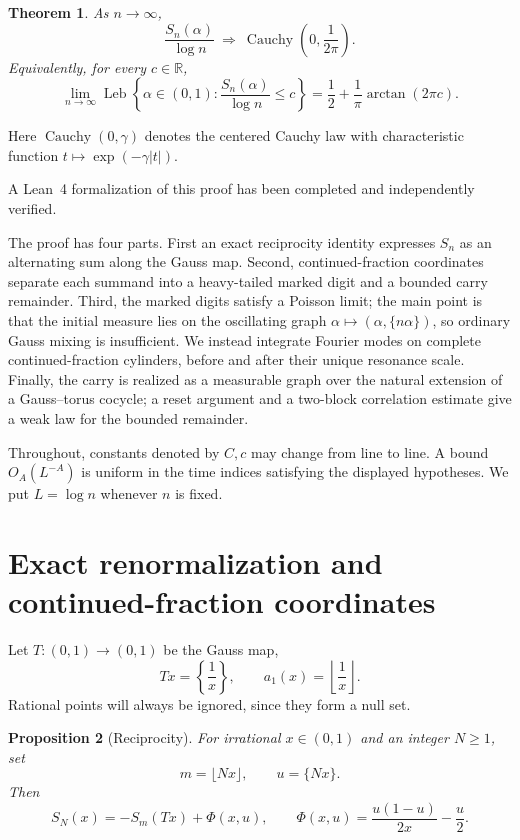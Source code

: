 \documentclass[11pt,a4paper]{amsart}
\newtheorem{theorem}{Theorem}[section]
\newtheorem{proposition}[theorem]{Proposition}
\theoremstyle{definition}
\theoremstyle{remark}
\newcommand{\R}{\mathbb R}
\newcommand{\Leb}{\operatorname{Leb}}
\begin{document}
\begin{theorem}\label{thm:main}
As $n\to\infty$,
\[
 \frac{S_n(\alpha)}{\log n}
 \ \Longrightarrow\
 \operatorname{Cauchy}\!\left(0,\frac1{2\pi}\right).
\]
Equivalently, for every $c\in\R$,
\[
 \lim_{n\to\infty}\Leb\left\{\alpha\in(0,1):
 \frac{S_n(\alpha)}{\log n}\le c\right\}
 =\frac12+\frac1\pi\arctan(2\pi c).
\]
\end{theorem}

Here $\operatorname{Cauchy}(0,\gamma)$ denotes the centered Cauchy law with
characteristic function $t\mapsto\exp(-\gamma|t|)$.

A Lean~4 formalization of this proof has been completed and independently
verified.

The proof has four parts.  First an exact reciprocity identity expresses
$S_n$ as an alternating sum along the Gauss map.  Second, continued-fraction
coordinates separate each summand into a heavy-tailed marked digit and a
bounded carry remainder.  Third, the marked digits satisfy a Poisson limit;
the main point is that the initial measure lies on the oscillating graph
$\alpha\mapsto(\alpha,\{n\alpha\})$, so ordinary Gauss mixing is insufficient.
We instead integrate Fourier modes on complete continued-fraction cylinders,
before and after their unique resonance scale.  Finally, the carry is realized
as a measurable graph over the natural extension of a Gauss--torus cocycle;
a reset argument and a two-block correlation estimate give a weak law for the
bounded remainder.

Throughout, constants denoted by $C,c$ may change from line to line.  A bound
$O_A(L^{-A})$ is uniform in the time indices satisfying the displayed
hypotheses.  We put $L=\log n$ whenever $n$ is fixed.

\section{Exact renormalization and continued-fraction coordinates}

Let $T:(0,1)\to(0,1)$ be the Gauss map,
\[
 Tx=\left\{\frac1x\right\},
 \qquad a_1(x)=\left\lfloor\frac1x\right\rfloor.
\]
Rational points will always be ignored, since they form a null set.

\begin{proposition}[Reciprocity]\label{prop:reciprocity}
For irrational $x\in(0,1)$ and an integer $N\ge1$, set
\[
 m=\lfloor Nx\rfloor,\qquad u=\{Nx\}.
\]
Then
\begin{equation}\label{eq:reciprocity}
 S_N(x)=-S_m(Tx)+\Phi(x,u),
 \qquad
 \Phi(x,u)=\frac{u(1-u)}{2x}-\frac u2.
\end{equation}
\end{proposition}
\end{document}
